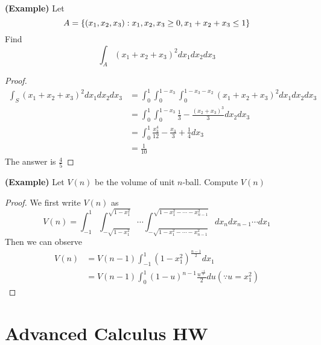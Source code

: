 \documentclass{report}
\begin{document}
\begin{theorem}
\label{4.6.4}
\textbf{(Example)} Let 
\begin{equation}
A=\{ (x_1,x_2,x_3):x_1,x_2,x_3 \geq 0, x_1+x_2+x_3\leq 1 \}
\end{equation}
Find
\begin{equation}
\int_A (x_1+x_2+x_3)^2 dx_1dx_2dx_3
\end{equation}
\end{theorem}
\begin{proof}
\begin{align}
\int_S(x_1+x_2+x_3)^2dx_1dx_2dx_3&=\int_0^1 \int_0^{1-x_3}\int_0^{1-x_3-x_2}(x_1+x_2+x_3)^2dx_1dx_2dx_3\\
&=\int_0^1\int_0^{1-x_3}\frac{1}{3}-\frac{(x_2+x_3)^3}{3}dx_2dx_3\\
&=\int_0^1 \frac{x_3^4}{12}-\frac{x_3}{3}+\frac{1}{4}dx_3\\
&=\frac{1}{10}
\end{align}
The answer is $\frac{4}{5}$
\end{proof}
\begin{theorem}
\label{4.6.5}
\textbf{(Example)} Let $V(n)$ be the volume of unit $n$-ball. Compute $V(n)$
\end{theorem}
\begin{proof}
We first write $V(n)$ as
 \begin{equation}
V(n)=\int_{-1}^1\int_{-\sqrt{1-x_1^2}}^{\sqrt{1-x_1^2}}\cdots \int^{\sqrt{1-x_1^2-\cdots -x_{n-1}^2} }_{-\sqrt{1-x_1^2-\cdots -x_{n-1}^2} }dx_ndx_{n-1}\cdots dx_1
\end{equation}
Then we can observe
\begin{align}
  V(n)&=V(n-1)\int_{-1}^1 (1-x_1^2)^{\frac{n-1}{2}}dx_1\\
  &=V(n-1)\int_0^1 (1-u)^{n-1}\frac{u^{\frac{-1}{2}}}{2}du (\because u=x_1^2)
\end{align}
\end{proof}
\chapter{Advanced Calculus HW}
\end{document}
